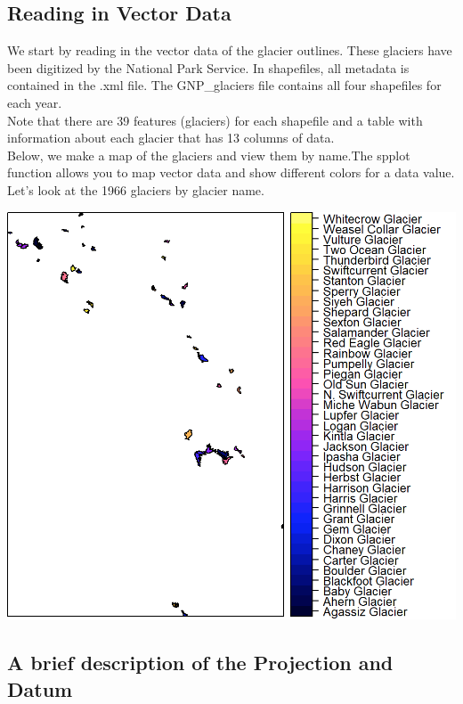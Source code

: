 \documentclass[11pt]{article}
\begin{document}
\subsection*{Reading in Vector Data}

We start by reading in the vector data of the glacier outlines. These glaciers have been digitized by the National Park Service. In shapefiles, all metadata is contained in the .xml file. The GNP\_glaciers file contains all four shapefiles for each year.\\

Note that there are 39 features (glaciers) for each shapefile and a table with information about each glacier that has 13 columns of data.\\

Below, we make a map of the glaciers and view them by name.The spplot function allows you to map vector data and show different colors for a data value. Let’s look at the 1966 glaciers by glacier name.\\

\begin{center}
\includegraphics[width=6in]{glacier_by_name.png}
\end{center}

\subsection*{A brief description of the Projection and Datum}
\end{document}
